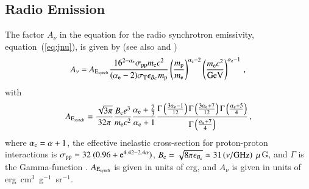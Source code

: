 \documentclass[useAMS,usenatbib]{mn2e}
\begin{document}
\begin{appendix}
%



\section{Radio Emission}
\label{app:A}

The factor $A_{\nu}$ in the equation for the radio synchrotron emissivity,
equation~(\ref{eq:jnu}), is given by (see also \citealp{2008MNRAS.385.1211P} and
\citealp{2011A&A...527A..99E})
%
\begin{equation}
A_{\nu} = A_{{\mathrm{E_{synch}}}} \frac{16^{2-\alpha_{{\mathrm{e}}}}\sigma_{{\mathrm{pp}}}m_{{\mathrm{e}}}c^{2}}{(\alpha_{{\mathrm{e}}}-2)\sigma_{{\mathrm{T}}}\epsilon_{B_{{\mathrm{C}}}}m_{{\mathrm{p}}}}\left(\frac{m_{{\mathrm{p}}}
}{m_{{\mathrm{e}}}}\right)^{\alpha_{{\mathrm{e}}}-2} \left(\frac{m_{{\mathrm{e}}}c^{2}}{{\mathrm{GeV}}}\right)^{\alpha_{{\mathrm{e}}}-1} \, ,
\end{equation}
%
with
%
\begin{equation}
A_{{\mathrm{E_{synch}}}} = \frac{\sqrt{3\pi}}{32\pi}\frac{B_{{\mathrm{c}}}e^{3}}{m_{{\mathrm{e}}}c^{2}}\frac{\alpha_{{\mathrm{e}}}+\frac{7}{3}}{\alpha_{{\mathrm{e}}}+1}\frac{\Gamma\left(\frac{3\alpha_{{\mathrm{e}}}-1}{12}\right)\Gamma\left(\frac{3\alpha_{{\mathrm{e}}}+7}{12}\right)\Gamma\left(\frac{\alpha_{{\mathrm{e}}}+5}{4}\right)}{\Gamma\left(\frac{\alpha_{{\mathrm{e}}}+7}{4}\right)} \, ,
\end{equation}
%
where $\alpha_{{\mathrm{e}}}=\alpha+1$, the effective inelastic cross-section for
proton-proton interactions is $\sigma_{{\mathrm{pp}}} =
32~(0.96+{\mathrm{e}}^{4.42-2.4\alpha})$, $B_{{\mathrm{c}}} = \sqrt{ 8 \pi
  \epsilon_{B_{{\mathrm{c}}}}} \simeq 31 \left( \nu/{\mathrm{GHz}} \right)~\mu$G, and
$\Gamma$ is the Gamma-function
\citep{1965hmfw.book.....A}. $A_{{\mathrm{E_{synch}}}}$ is given in units of erg, and
$A_{\nu}$ is given in units of erg~cm$^{3}$~g$^{-1}$~sr$^{-1}$.


\end{appendix}
\end{document}
